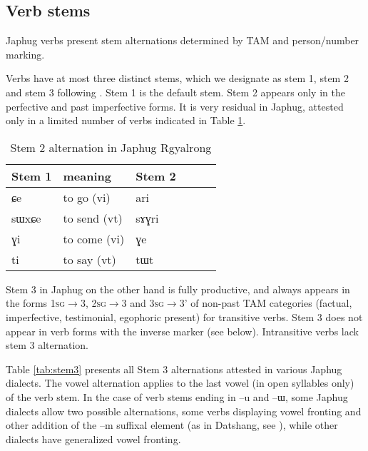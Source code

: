 \documentclass[oldfontcommands,oneside,a4paper,11pt]{article}
\newcommand{\ipa}[1]{{\phon#1}} %
\begin{document}
\subsection{Verb stems}

Japhug verbs present stem alternations determined by TAM and person/number marking. 

Verbs have at most three distinct stems, which we designate as stem 1, stem 2 and stem 3 following \citet{jackson00sidaba}. Stem 1 is the default stem. Stem 2 appears only in the perfective and past imperfective forms. It is very residual in Japhug, attested only in a limited number of verbs indicated in Table \ref{tab:stem2}.


 \begin{table} 
\caption{Stem 2 alternation in Japhug Rgyalrong} \label{tab:stem2} \centering
\begin{tabular}{llllll}
\toprule
Stem 1 & meaning &Stem 2 \\
\midrule
\ipa{ɕe}& to go (vi)&  \ipa{ari} \\
\ipa{sɯxɕe}& to send (vt)  &\ipa{sɤɣri} \\
\ipa{ɣi}& to come (vi)  &\ipa{ɣe} \\
\ipa{ti}& to say (vt)  &\ipa{tɯt} \\
\bottomrule
\end{tabular}
\end{table}

Stem 3 in Japhug on the other hand is fully productive, and always appears in the forms \textsc{1sg}$\rightarrow$3, \textsc{2sg}$\rightarrow$3 and \textsc{3sg}$\rightarrow$3' of non-past TAM categories (factual, imperfective, testimonial, egophoric present) for transitive verbs. Stem 3 does not appear in verb forms with the inverse marker (see below). Intransitive verbs lack stem 3 alternation.

Table \ref{tab:stem3} presents all Stem 3 alternations attested in various Japhug dialects. The vowel alternation applies to the last vowel (in open syllables only) of the verb stem. In the case of verb stems ending in  \ipa{--u} and  \ipa{--ɯ}, some Japhug dialects allow two possible alternations, some verbs displaying vowel fronting and other addition of the \ipa{--m} suffixal element (as in Datshang, see \citealt{linluo03}), while other dialects have generalized vowel fronting.
\end{document}
